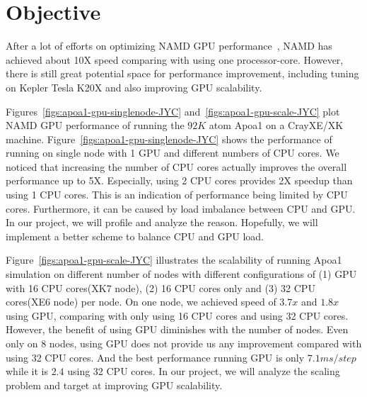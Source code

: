 \documentclass[11pt,onecolumn]{article}
\newcommand{\namd}{\textsc{namd}}
\begin{document}

\section{Objective}
After a lot of efforts on optimizing NAMD GPU performance~\cite{phillips_stone_namd_cuda}, NAMD has achieved 
about 10X speed comparing with using one processor-core. However, there is still great
potential space for performance improvement, including tuning on Kepler Tesla K20X and
also improving GPU scalability.

Figures~\ref{figs:apoa1-gpu-singlenode-JYC} and~\ref{figs:apoa1-gpu-scale-JYC}
plot NAMD GPU performance of running the $92K$ atom Apoa1 on a CrayXE/XK machine.
Figure~\ref{figs:apoa1-gpu-singlenode-JYC} shows the performance of running on 
single node with 1 GPU and different numbers of CPU cores. We noticed that increasing
the number of CPU cores actually improves the overall performance up to 5X. Especially, 
using 2 CPU cores provides 2X speedup than using 1 CPU cores.
This is an indication of performance being limited by CPU cores. Furthermore, 
it can be caused by load imbalance between CPU and GPU. In our project, we will profile
and analyze the reason. Hopefully, we will implement a better scheme to balance CPU and GPU load.

Figure~\ref{figs:apoa1-gpu-scale-JYC} illustrates the scalability of 
running Apoa1 simulation on different number of nodes with different configurations of 
(1) GPU with 16 CPU cores(XK7 node), (2) 16 CPU cores only and (3) 32 CPU cores(XE6 node) per node.
On one node, we achieved speed of $3.7x$ and $1.8x$ using GPU, comparing with only using 16 CPU cores
and using 32 CPU cores. However, the benefit of using GPU diminishes with the number of nodes.
Even only on 8 nodes, using GPU does not provide us any improvement compared with using 32 CPU cores.
And the best performance running GPU is only $7.1ms/step$ while it is $2.4$ using 32 CPU cores.
In our project, we will analyze the scaling problem and target at improving GPU scalability.
\end{document}
